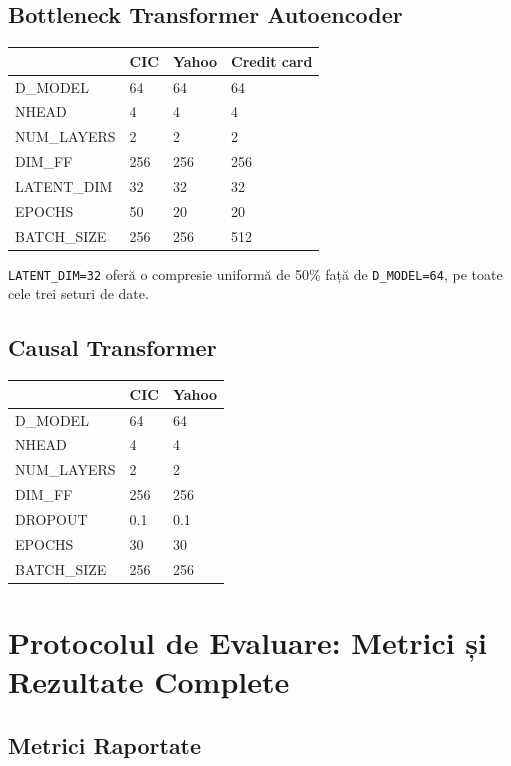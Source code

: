 \section{Bottleneck Transformer Autoencoder}

\begin{center}
\begin{tabular}{llll}
\toprule
 & CIC & Yahoo & Credit card \\
\midrule
D\_MODEL & 64 & 64 & 64 \\
NHEAD & 4 & 4 & 4 \\
NUM\_LAYERS & 2 & 2 & 2 \\
DIM\_FF & 256 & 256 & 256 \\
LATENT\_DIM & 32 & 32 & 32 \\
EPOCHS & 50 & 20 & 20 \\
BATCH\_SIZE & 256 & 256 & 512 \\
\bottomrule
\end{tabular}
\end{center}

\texttt{LATENT\_DIM=32} oferă o compresie uniformă de 50\% față de \texttt{D\_MODEL=64}, pe toate cele trei seturi de date.

\section{Causal Transformer}

\begin{center}
\begin{tabular}{lll}
\toprule
 & CIC & Yahoo \\
\midrule
D\_MODEL & 64 & 64 \\
NHEAD & 4 & 4 \\
NUM\_LAYERS & 2 & 2 \\
DIM\_FF & 256 & 256 \\
DROPOUT & 0.1 & 0.1 \\
EPOCHS & 30 & 30 \\
BATCH\_SIZE & 256 & 256 \\
\bottomrule
\end{tabular}
\end{center}



\chapter{Protocolul de Evaluare: Metrici și Rezultate Complete}
\label{sec:eval-metrics}

\section{Metrici Raportate}


